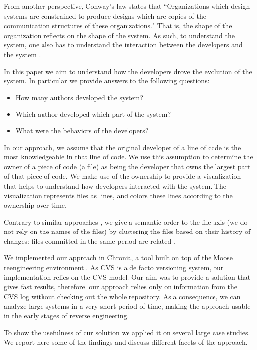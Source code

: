 \documentclass[10pt]{book}
\begin{document}
From another perspective, Conway's law \cite{Conw68a} states that ``Organizations which design systems are constrained to produce designs which are copies of the communication structures of these organizations." That is, the shape of the organization reflects on the shape of the system. As such, to understand the system, one also has to understand the interaction between the developers and the system \cite{Deme02a}.

In this paper we aim to understand how the developers drove the evolution of the system. In particular we provide answers to the following questions:
\begin{itemize}
\item How many authors developed the system?
\item Which author developed which part of the system?
\item What were the behaviors of the developers?
\end{itemize}

In our approach, we assume that the original developer of a line of code is the most knowledgeable in that line of code. We use this assumption to determine the owner of a piece of code (\eg a file) as being the developer that owns the largest part of that piece of code. We make use of the ownership to provide a visualization that helps to understand how developers interacted with the system. The visualization represents files as lines, and colors these lines according to the ownership over time.

Contrary to similar approaches \cite{Ryss04a}, we give a semantic order to the file axis (\ie we do not rely on the names of the files) by clustering the files based on their history of changes: files committed in the same period are related \cite{Gall98a}.

We implemented our approach in Chronia, a tool built on top of the Moose reengineering environment \cite{Duca05a}. As CVS is a de facto versioning system, our implementation relies on the CVS model. Our aim was to provide a solution that gives fast results, therefore, our approach relies only on information from the CVS log without checking out the whole repository. As a consequence, we can analyze large systems in a very short period of time, making the approach usable in the early stages of reverse engineering.

To show the usefulness of our solution we applied it on several large case studies. We report here some of the findings and discuss different facets of the approach.
\end{document}
